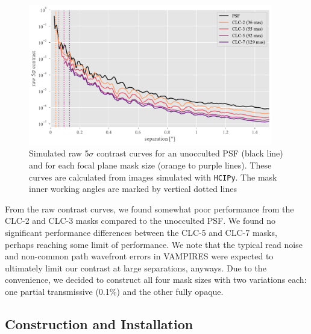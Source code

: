 \documentclass[]{spie}  %
\begin{document}
\begin{figure}
   \centering
   \includegraphics[width=0.95\textwidth]{figures/simulated_curves}
   \caption{Simulated raw 5$\sigma$ contrast curves for an unocculted PSF (black line) and for each focal plane mask size (orange to purple lines). These curves are calculated from images simulated with \texttt{HCIPy}. The mask inner working angles are marked by vertical dotted lines}\label{fig:sim-contrast}
\end{figure}

From the raw contrast curves, we found somewhat poor performance from the CLC-2 and CLC-3 masks compared to the unocculted PSF. We found no significant performance differences between the CLC-5 and CLC-7 masks, perhaps reaching some limit of performance. We note that the typical read noise and non-common path wavefront errors in VAMPIRES were expected to ultimately limit our contrast at large separations, anyways. Due to the convenience, we decided to construct all four mask sizes with two variations each: one partial transmissive (0.1\%) and the other fully opaque. 

\subsection{Construction and Installation}\label{sec:install}
\end{document}
